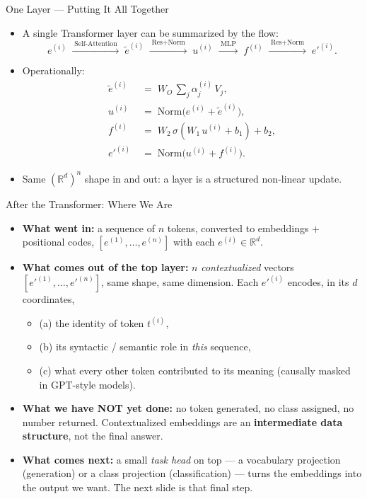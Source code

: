 \documentclass[10pt,english,aspectratio=169]{beamer}
\begin{document}
\begin{frame}{One Layer --- Putting It All Together}
\begin{itemize}
\item A single Transformer layer can be summarized by the flow:
\[
   e^{(i)} \;\xrightarrow{\;\text{Self-Attention}\;}\; \tilde{e}^{(i)}
   \;\xrightarrow{\;\text{Res+Norm}\;}\; u^{(i)}
   \;\xrightarrow{\;\text{MLP}\;}\; f^{(i)}
   \;\xrightarrow{\;\text{Res+Norm}\;}\; e'^{(i)}.
\]

\medskip
\item Operationally:
\[
   \begin{aligned}
       \tilde{e}^{(i)} &\;=\; W_{O}\,\sum_{j} \alpha_{j}^{(i)}\,V_{j}, \\[2pt]
       u^{(i)} &\;=\; \mathrm{Norm}\bigl(e^{(i)} + \tilde{e}^{(i)}\bigr), \\[2pt]
       f^{(i)} &\;=\; W_{2}\,\sigma(W_{1}\,u^{(i)} + b_{1}) + b_{2}, \\[2pt]
       e'^{(i)} &\;=\; \mathrm{Norm}\bigl(u^{(i)} + f^{(i)}\bigr).
   \end{aligned}
\]

\medskip
\item Same $(\mathbb{R}^d)^n$ shape in and out: a layer is a structured non-linear update.
\end{itemize}
\end{frame}

\begin{frame}{After the Transformer: Where We Are}
\begin{itemize}
\item \textbf{What went in:} a sequence of $n$ tokens, converted to embeddings $+$ positional codes, $[e^{(1)}, \ldots, e^{(n)}]$ with each $e^{(i)} \in \mathbb{R}^{d}$.

\medskip
\item \textbf{What comes out of the top layer:} $n$ \emph{contextualized} vectors $[e'^{(1)}, \ldots, e'^{(n)}]$, same shape, same dimension. Each $e'^{(i)}$ encodes, in its $d$ coordinates,
\begin{itemize}
    \item (a) the identity of token $t^{(i)}$,
    \item (b) its syntactic / semantic role in \emph{this} sequence,
    \item (c) what every other token contributed to its meaning (causally masked in GPT-style models).
\end{itemize}

\medskip
\item \textbf{What we have NOT yet done:} no token generated, no class assigned, no number returned. Contextualized embeddings are an \textbf{intermediate data structure}, not the final answer.

\medskip
\item \textbf{What comes next:} a small \emph{task head} on top --- a vocabulary projection (generation) or a class projection (classification) --- turns the embeddings into the output we want. The next slide is that final step.
\end{itemize}
\end{frame}
\end{document}

